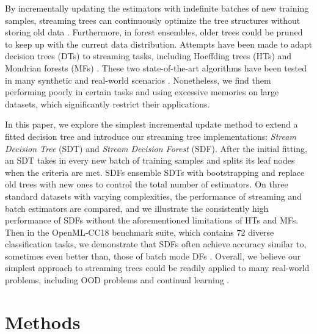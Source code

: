 By incrementally updating the estimators with indefinite batches of new training samples, streaming trees can continuously optimize the tree structures without storing old data \citep{domingos_mining_2000, bifet_adaptive_2009, lakshminarayanan_mondrian_2014, ben-haim_streaming_2010}. Furthermore, in forest ensembles, older trees could be pruned to keep up with the current data distribution. Attempts have been made to adapt decision trees (DTs) to streaming tasks, including Hoeffding trees (HTs) and Mondrian forests (MFs) \citep{domingos_mining_2000, lakshminarayanan_mondrian_2014}. These two state-of-the-art algorithms have been tested in many synthetic and real-world scenarios \citep{pfahringer_new_2007, gomes_machine_2019, lakshminarayanan_mondrian_2016, khannouz_benchmark_2020}. Nonetheless, we find them performing poorly in certain tasks and using excessive memories on large datasets, which significantly restrict their applications.

In this paper, we explore the simplest incremental update method to extend a fitted decision tree and introduce our streaming tree implementations: \textit{Stream Decision Tree} (SDT) and \textit{Stream Decision Forest} (SDF).
After the initial fitting, an SDT takes in every new batch of training samples and splits its leaf nodes when the criteria are met. SDFs ensemble SDTs with bootstrapping and replace old trees with new ones to control the total number of estimators. 
On three standard datasets with varying complexities, the performance of streaming and batch estimators are compared, and we illustrate the consistently high performance of SDFs without the aforementioned limitations of HTs and MFs. Then in the OpenML-CC18 benchmark suite,
which contains 72 diverse classification tasks, we demonstrate that SDFs often achieve accuracy similar to, sometimes even better than, those of batch mode DFs \citep{vanschoren_openml_2013, bischl_openml_2019}. Overall, we believe our simplest approach to streaming trees could be readily applied to many real-world problems, including OOD problems and continual learning \citep{geisa_towards_2021, van_de_ven_three_2019}.

\section{Methods} 
\label{methods}

